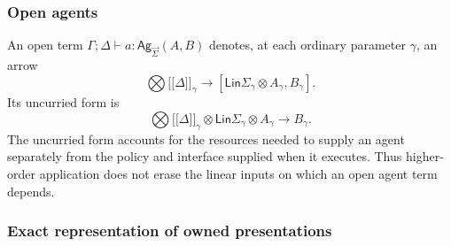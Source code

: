 \documentclass[11pt,a4paper]{article}
\numberwithin{equation}{section}
\theoremstyle{definition}
\theoremstyle{remark}
\theoremstyle{plain}
\providecommand{\Ag}{\mathsf{Ag}}
\providecommand{\sig}{\vec{\Sigma}}
\providecommand{\Lin}{\mathsf{Lin}}
\providecommand{\linturn}{\vdash}
\providecommand{\llbracket}{\mathopen{[\![}}
\providecommand{\rrbracket}{\mathclose{]\!]}}
\providecommand{\sem}[1]{\llbracket #1\rrbracket}
\begin{document}
\subsubsection{Open agents}

An open term $\Gamma;\Delta\linturn a:\Ag_{\sig}(A,B)$ denotes, at each
ordinary parameter $\gamma$, an arrow
\[
 \bigotimes\sem\Delta_\gamma
 \longrightarrow[\Lin\Sigma_\gamma\otimes A_\gamma,B_\gamma].
\]
Its uncurried form is
\[
 \bigotimes\sem\Delta_\gamma\otimes\Lin\Sigma_\gamma\otimes A_\gamma
 \longrightarrow B_\gamma.
\]
The uncurried form accounts for the resources needed to supply an
agent separately from the policy and interface supplied when it executes.
Thus higher-order application does not erase the linear inputs on which
an open agent term depends.

\subsubsection{Exact representation of owned presentations}
\end{document}
